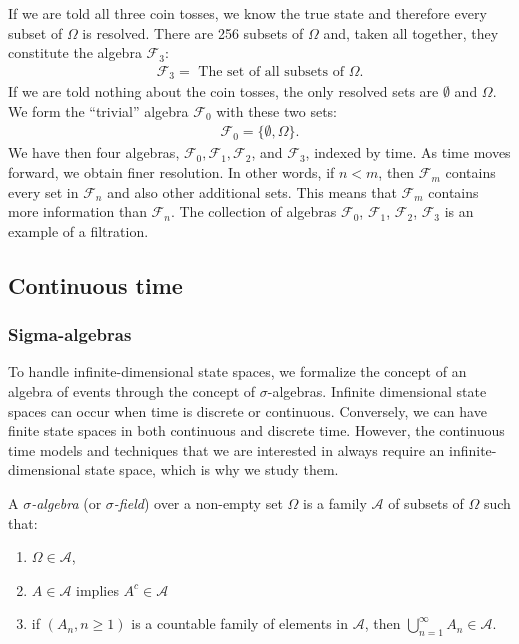 \documentclass[\topdir/lecture\_notes.tex]{subfiles}
\begin{document}
\begin{optional}
\begin{example}
If we are told all three coin tosses, we know the true state and therefore every subset of $\Omega$ is resolved. There are 256 subsets of $\Omega$ and, taken all together, they constitute the algebra $\mathcal{F}_{3}$:
\begin{align*}
\mathcal{F}_{3}=\text{ The set of all subsets of } \Omega.
\end{align*}
If we are told nothing about the coin tosses, the only resolved sets are $\emptyset$ and $\Omega$. We form the ``trivial'' algebra $\mathcal{F}_{0}$ with these two sets:
\begin{align*}
\mathcal{F}_{0}=\{\emptyset, \Omega\}.
\end{align*}
We have then four algebras, $\mathcal{F}_{0}, \mathcal{F}_{1}, \mathcal{F}_{2}$, and $\mathcal{F}_{3}$, indexed by time. As time moves forward, we obtain finer resolution. In other words, if $n<m$, then $\mathcal{F}_{m}$ contains every set in $\mathcal{F}_{n}$ and also other additional sets. This means that $\mathcal{F}_{m}$ contains more information than $\mathcal{F}_{n}$. The collection of algebras $\mathcal{F}_{0}$, $\mathcal{F}_{1}$, $\mathcal{F}_{2}$, $\mathcal{F}_{3}$ is an example of a filtration.
\end{example}
\end{optional}

\subsection{Continuous time}
\subsubsection*{Sigma-algebras}
To handle infinite-dimensional state spaces, we formalize the concept of an algebra of events through the concept of $\sigma$-algebras. Infinite dimensional state spaces can occur when time is discrete or continuous. Conversely, we can have finite state spaces in both continuous and discrete time. However, the continuous time models and techniques that we are interested in always require an infinite-dimensional state space, which is why we study them.

\begin{defn}\label{defn:sigma_algebra}
A \emph{$\sigma$-algebra} (or \emph{$\sigma$-field}) over a non-empty set $\Omega$ is a family $\mathcal{A}$ of subsets of $\Omega$ such that:
\begin{enumerate}
    \item $\Omega \in \mathcal{A}$,
    \item $A \in \mathcal{A}$ implies $A^{c} \in \mathcal{A}$ 
    \item if $(A_{n}, n \geq 1)$ is a countable family of elements in $\mathcal{A}$, then $\bigcup_{n=1}^{\infty} A_{n} \in \mathcal{A}$.
\end{enumerate}
\end{defn}
\end{document}
